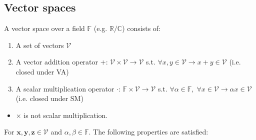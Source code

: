 \subsection{Vector spaces} 
\begin{definition}
    A vector space over a field $\mathbb{F}$ (e.g. $\mathbb{R} \text{/} \mathbb{C}$) consists of: 
    \begin{enumerate}
        \item A set of vectors \(\mathcal{V}\) 
        \item A vector addition operator $+$: $\mathcal{V} \times \mathcal{V} \rightarrow \mathcal{V}$ s.t. $\forall x,y\in \mathcal{V} \rightarrow x+y\in \mathcal{V}$ (i.e. closed under VA)
        \item A scalar multiplication operator $\cdot$: $\mathbb{F} \times \mathcal{V} \rightarrow \mathcal{V}$ s.t. $\forall \alpha \in \mathbb{F}, \; \forall x\in \mathcal{V} \rightarrow \alpha x \in \mathcal{V}$ (i.e. closed under SM)
    \end{enumerate}
    \begin{itemize}
        \item $\times$ is not scalar multiplication.
    \end{itemize}
    \vspace{1em}

    For \( \mathbf{x}, \mathbf{y}, \mathbf{z} \in \mathcal{V} \) and \( \alpha, \beta \in \mathbb{F} \). The following properties are satisfied:


\end{definition}
